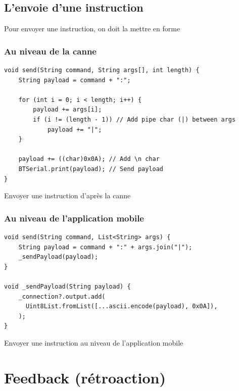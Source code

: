 \subsection{L'envoie d'une instruction}

Pour envoyer une instruction, on doit la mettre en forme

\subsubsection{Au niveau de la canne}
\begin{code}
\begin{verbatim}
void send(String command, String args[], int length) {
    String payload = command + ":";

    for (int i = 0; i < length; i++) {
        payload += args[i];
        if (i != (length - 1)) // Add pipe char (|) between args
            payload += "|";
    }
    
    payload += ((char)0x0A); // Add \n char
    BTSerial.print(payload); // Send payload
}
\end{verbatim}
\caption{Envoyer une instruction d'après la canne}
\end{code}

\subsubsection{Au niveau de l'application mobile}
\begin{code}
\begin{verbatim}
void send(String command, List<String> args) {
    String payload = command + ":" + args.join("|");
    _sendPayload(payload);
}

void _sendPayload(String payload) {
    _connection?.output.add(
      Uint8List.fromList([...ascii.encode(payload), 0x0A]),
    );
}
\end{verbatim}
\caption{Envoyer une instruction au niveau de l'application mobile}
\end{code}


\section{Feedback (rétroaction)}

